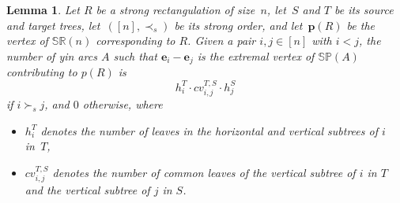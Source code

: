 \documentclass{amsart}
\newtheorem{lemma}[theorem]{Lemma}
\theoremstyle{definition}
\renewcommand{\b}[1]{{\boldsymbol{#1}}} %
\newcommand{\polytope}[1]{\mathds{#1}} %
\newcommand{\SRP}{\polytope{SR}} %
\newcommand{\SP}{\polytope{SP}}
\begin{document}
\begin{lemma}
  Let $R$ be a strong rectangulation of size~$n$, let~$S$ and $T$ be its source and target trees, let~$([n],\prec_s)$ be its strong order, and let~$\b{p}(R)$ be the vertex of $\SRP(n)$ corresponding to $R$.
  Given a pair $i,j\in [n]$ with $i<j$, the number of yin arcs $A$ such that $\b{e}_i-\b{e}_j$ is the extremal vertex of $\SP(A)$ contributing to $p(R)$ is
  \[
    h^T_i \cdot cv^{T,S}_{i,j}\cdot h^S_j 
  \]
  if $i\succ_s j$, and $0$ otherwise, where
  \begin{itemize}
  \item $h^T_i$ denotes the number of leaves in the horizontal and vertical subtrees of $i$ in~$T$,
  \item $cv^{T,S}_{i,j}$ denotes the number of common leaves of the vertical subtree of $i$ in $T$ and the vertical subtree of $j$ in $S$.
  \end{itemize}  
\end{lemma}
\end{document}
